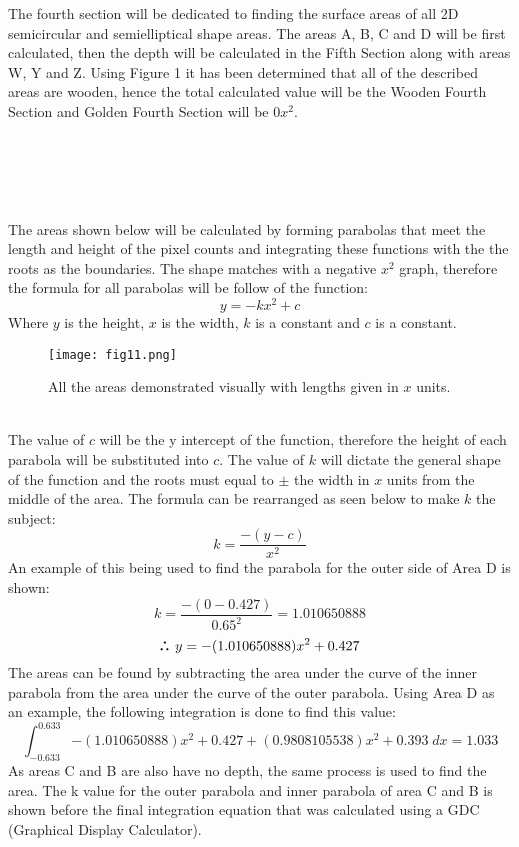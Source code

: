 \documentclass[a4paper,12pt]{article}
\begin{document}
The fourth section will be dedicated to finding the surface areas of all 2D semicircular and semielliptical shape areas. The areas A, B, C and D will be first calculated, then the depth will be calculated in the Fifth Section along with areas W, Y and Z. Using Figure 1 it has been determined that all of the described areas are wooden, hence the total calculated value will be the Wooden Fourth Section and Golden Fourth Section will be 0$x^2$.
\\
\\
\\
\\
\\
\\
The areas shown below will be calculated by forming parabolas that meet the length and height of the pixel counts and integrating these functions with the the roots as the boundaries. The shape matches with a negative $x^2$ graph, therefore the formula for all parabolas will be follow of the function: $$y=-kx^2+c$$ Where $y$ is the height, $x$ is the width, $k$ is a constant and $c$ is a constant.
\def\therefore{\boldsymbol{\text{ }
\leavevmode
\lower0.4ex\hbox{$\cdot$}
\kern-.5em\raise0.7ex\hbox{$\cdot$}
\kern-0.55em\lower0.4ex\hbox{$\cdot$}
\thinspace\text{ }}}
\begin{figure}[h!]
\centering
\texttt{[image: fig11.png]}
\caption{All the areas demonstrated visually with lengths given in $x$ units.}
\label{fig:clock11}
\end{figure}
\\The value of $c$ will be the y intercept of the function, therefore the height of each parabola will be substituted into $c$. The value of $k$ will dictate the general shape of the function and the roots must equal to $\pm$ the width in $x$ units from the middle of the area. The formula can be rearranged as seen below to make $k$ the subject: $$k=\frac{-(y-c)}{x^2}$$ An example of this being used to find the parabola for the outer side of Area D is shown: $$k=\frac{-(0-0.427)}{0.65^2}=1.010650888$$ $$\therefore \; y=-(1.010650888)x^2+0.427$$ The areas can be found by subtracting the area under the curve of the inner parabola from the area under the curve of the outer parabola. Using Area D as an example, the following integration is done to find this value: $$\int_{-0.633}^{0.633}{-(1.010650888)x^2+0.427+(0.9808105538)x^2+0.393}\;dx=1.033$$ As areas C and B are also have no depth, the same process is used to find the area. The k value for the outer parabola and inner parabola of area C and B is shown before the final integration equation that was calculated using a GDC (Graphical Display Calculator).
\end{document}
